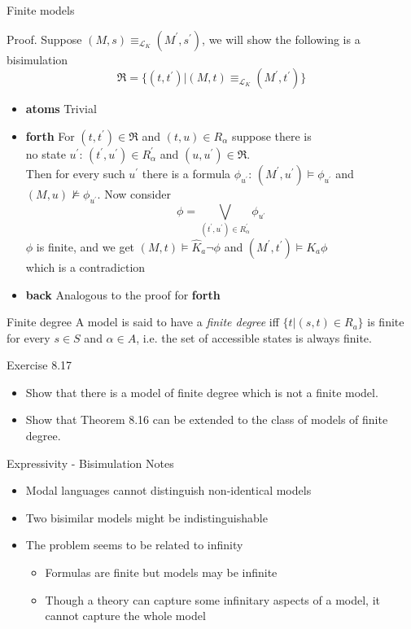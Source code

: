 \documentclass{beamer}
\newcommand{\lang}{\mathcal{L}}
\begin{document}
\begin{frame}{Finite models}
	\begin{block}{Proof.}
		Suppose $(M,s) \equiv_{\lang_K} (M^\prime,s^\prime)$, we will show the following is a bisimulation
		\[\mathfrak{R} = \{(t,t^\prime) | (M,t) \equiv_{\lang_K} (M^\prime,t^\prime)\}\]
		\begin{itemize}
			\item \textbf{atoms} Trivial
			\item \textbf{forth} For $(t,t^\prime) \in \mathfrak{R}$ and $(t,u) \in R_{\alpha}$ suppose there is\\
				no state $u^\prime$: $(t^\prime,u^\prime) \in R_{\alpha}^\prime$ and $(u,u^\prime) \in \mathfrak{R}$.\\
				Then for every such $u^\prime$ there is a formula $\phi_{u^\prime}$: $(M^\prime,u^\prime) \models \phi_{u^\prime}$ and $(M,u) \not\models \phi_{u^\prime}$.
				Now consider
				\[\phi = \bigvee_{(t^\prime,u^\prime)\in R_{\alpha}^\prime} \phi_{u^\prime}\]
			$\phi$ is finite, and we get $(M,t) \models \hat{K}_a \neg \phi$ and $(M^\prime,t^\prime) \models K_a \phi$\\
				which is a contradiction
			\item \textbf{back} Analogous to the proof for \textbf{forth}
		\end{itemize}
	\end{block}
\end{frame}

\begin{frame}{Finite degree}
	A model is said to have a \textit{finite degree} iff $\{t | (s,t) \in R_a\}$ is finite for every $s \in S$ and $\alpha \in A$, i.e. the set of accessible states is always finite.
	\begin{block}{Exercise 8.17}
		\begin{itemize}
			\item Show that there is a model of finite degree which is not a finite model.
			\item Show that Theorem 8.16 can be extended to the class of models of finite degree.
		\end{itemize}
	\end{block}
\end{frame}

\begin{frame}{Expressivity - Bisimulation}
	Notes
	\begin{itemize}
		\item Modal languages cannot distinguish non-identical models
		\item Two bisimilar models might be indistinguishable
		\item The problem seems to be related to infinity
			\begin{itemize}
				\item Formulas are finite but models may be infinite
				\item Though a theory can capture some infinitary aspects of a model, it cannot capture the whole model
			\end{itemize}
	\end{itemize}
\end{frame}
\end{document}
